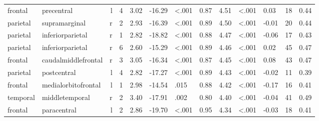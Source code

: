 \documentclass{article}
\begin{document}
\begin{longtable}{llrR{1.3cm}R{1cm}R{1.3cm}R{1cm}R{1cm}R{1.3cm}R{1cm}R{1.8cm}R{1.3cm}R{1.8cm}}
   frontal &                precentral &    l &         4 &                  3.02 &           -16.29 &      \textless.001 &                               0.87 &                          4.51 &                   \textless.001 &   0.03 &     18 &      0.44 \\
  parietal &             supramarginal &    r &         2 &                  2.93 &           -16.39 &      \textless.001 &                               0.89 &                          4.50 &                   \textless.001 &  -0.01 &     20 &      0.44 \\
  parietal &          inferiorparietal &    r &         1 &                  2.82 &           -18.82 &      \textless.001 &                               0.88 &                          4.47 &                   \textless.001 &  -0.06 &     17 &      0.43 \\
  parietal &          inferiorparietal &    r &         6 &                  2.60 &           -15.29 &      \textless.001 &                               0.89 &                          4.46 &                   \textless.001 &   0.02 &     45 &      0.47 \\
   frontal &       caudalmiddlefrontal &    r &         3 &                  3.05 &           -16.34 &      \textless.001 &                               0.87 &                          4.45 &                   \textless.001 &   0.08 &     43 &      0.47 \\
  parietal &               postcentral &    l &         4 &                  2.82 &           -17.27 &      \textless.001 &                               0.89 &                          4.43 &                   \textless.001 &  -0.02 &     11 &      0.39 \\
   frontal &       medialorbitofrontal &    l &         1 &                  2.98 &           -14.54 &               .015 &                               0.88 &                          4.42 &                   \textless.001 &  -0.17 &     16 &      0.41 \\
  temporal &            middletemporal &    r &         2 &                  3.40 &           -17.91 &               .002 &                               0.80 &                          4.40 &                   \textless.001 &  -0.04 &     41 &      0.49 \\
   frontal &               paracentral &    l &         2 &                  2.86 &           -19.70 &      \textless.001 &                               0.95 &                          4.34 &                   \textless.001 &  -0.03 &     18 &      0.41 \\

\end{longtable}
\end{document}
